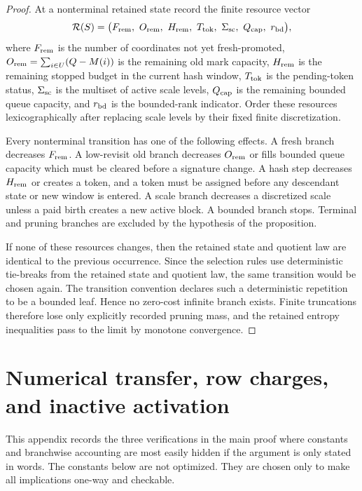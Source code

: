 \documentclass[11pt]{article}
\theoremstyle{remark}
\begin{document}
\begin{proof}
At a nonterminal retained state record the finite resource vector
\[
\mathcal R(S)=\bigl(F_{\rm rem},\ O_{\rm rem},\ H_{\rm rem},\ T_{\rm tok},\ \Sigma_{\rm sc},\ Q_{\rm cap},\ r_{\rm bd}\bigr),
\]
where $F_{\rm rem}$ is the number of coordinates not yet fresh-promoted, $O_{\rm rem}=\sum_{i\in U}(Q-M(i))$ is the remaining old mark capacity, $H_{\rm rem}$ is the remaining stopped budget in the current hash window, $T_{\rm tok}$ is the pending-token status, $\Sigma_{\rm sc}$ is the multiset of active scale levels, $Q_{\rm cap}$ is the remaining bounded queue capacity, and $r_{\rm bd}$ is the bounded-rank indicator.  Order these resources lexicographically after replacing scale levels by their fixed finite discretization.

Every nonterminal transition has one of the following effects.  A fresh branch decreases $F_{\rm rem}$.  A low-revisit old branch decreases $O_{\rm rem}$ or fills bounded queue capacity which must be cleared before a signature change.  A hash step decreases $H_{\rm rem}$ or creates a token, and a token must be assigned before any descendant state or new window is entered.  A scale branch decreases a discretized scale unless a paid birth creates a new active block.  A bounded branch stops.  Terminal and pruning branches are excluded by the hypothesis of the proposition.

If none of these resources changes, then the retained state and quotient law are identical to the previous occurrence.  Since the selection rules use deterministic tie-breaks from the retained state and quotient law, the same transition would be chosen again.  The transition convention declares such a deterministic repetition to be a bounded leaf.  Hence no zero-cost infinite branch exists.  Finite truncations therefore lose only explicitly recorded pruning mass, and the retained entropy inequalities pass to the limit by monotone convergence.
\end{proof}



\section{Numerical transfer, row charges, and inactive activation}\label{app:numerical-details}

This appendix records the three verifications in the main proof where constants and branchwise accounting are most easily hidden if the argument is only stated in words.  The constants below are not optimized.  They are chosen only to make all implications one-way and checkable.
\end{document}
